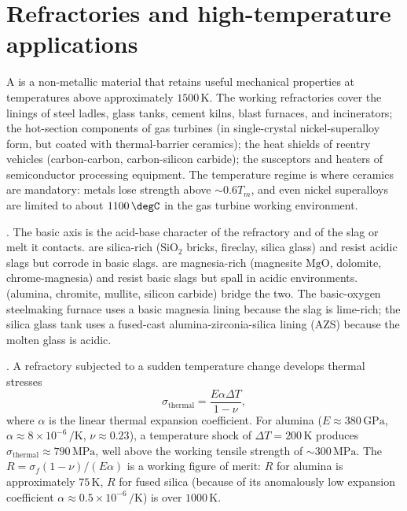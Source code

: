 \section{Refractories and high-temperature applications}

A  is a non-metallic material that retains useful
mechanical properties at temperatures above approximately $1500\,
\si{\kelvin}$. The working refractories cover the linings of steel
ladles, glass tanks, cement kilns, blast furnaces, and incinerators;
the hot-section components of gas turbines (in single-crystal
nickel-superalloy form, but coated with thermal-barrier ceramics);
the heat shields of reentry vehicles (carbon-carbon, carbon-silicon
carbide); the susceptors and heaters of semiconductor processing
equipment. The temperature regime is where ceramics are mandatory:
metals lose strength above $\sim 0.6 T_m$, and even nickel
superalloys are limited to about $1100\,\degC$ in the gas turbine
working environment.

. The basic axis is the
acid-base character of the refractory and of the slag or melt it
contacts.  are silica-rich
($\mathrm{SiO_2}$ bricks, fireclay, silica glass) and resist acidic
slags but corrode in basic slags.  are
magnesia-rich (magnesite $\mathrm{MgO}$, dolomite, chrome-magnesia)
and resist basic slags but spall in acidic environments.
 (alumina, chromite, mullite, silicon
carbide) bridge the two. The basic-oxygen steelmaking furnace uses a
basic magnesia lining because the slag is lime-rich; the silica glass
tank uses a fused-cast alumina-zirconia-silica lining (AZS) because
the molten glass is acidic.

. A refractory subjected to a sudden
temperature change develops thermal stresses
\[
\sigma_{\text{thermal}} = \frac{E \alpha \Delta T}{1 - \nu},
\]
where $\alpha$ is the linear thermal expansion coefficient. For
alumina ($E \approx 380\,\text{GPa}$, $\alpha \approx 8 \times
10^{-6}\,\si{\per\kelvin}$, $\nu \approx 0.23$), a temperature shock
of $\Delta T = 200\,\si{\kelvin}$ produces $\sigma_{\text{thermal}}
\approx 790\,\text{MPa}$, well above the working tensile strength of
$\sim 300\,\text{MPa}$. The 
$R = \sigma_f (1 - \nu)/(E \alpha)$ is a working figure of merit:
$R$ for alumina is approximately $75\,\si{\kelvin}$, $R$ for fused
silica (because of its anomalously low expansion coefficient
$\alpha \approx 0.5 \times 10^{-6}\,\si{\per\kelvin}$) is over
$1000\,\si{\kelvin}$.

